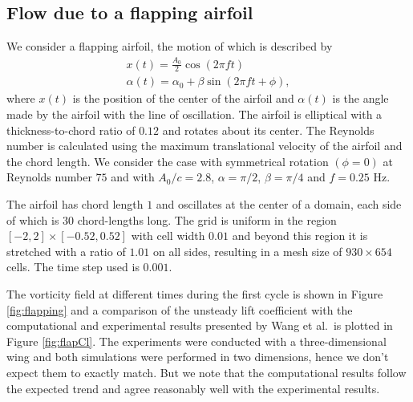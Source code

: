 \documentclass{tufte-handout}
\begin{document}
\subsection{\large Flow due to a flapping airfoil}

We consider a flapping airfoil, the motion of which is described by
\begin{align}
	x(t) = \frac{A_0}{2} \cos (2{\pi}{f}{t}) \nonumber \\
	\alpha (t) = \alpha_0 + \beta \sin ( 2{\pi}{f}{t} + \phi ), \nonumber
\end{align}
where $x(t)$ is the position of the center of the airfoil and $\alpha(t)$ is the angle made by the airfoil with the line of oscillation. The airfoil is elliptical with a thickness-to-chord ratio of $0.12$ and rotates about its center. The Reynolds number is calculated using the maximum translational velocity of the airfoil and the chord length. We consider the case with symmetrical rotation $(\phi=0)$ at Reynolds number $75$ and with ${A_0}/{c}=2.8$, $\alpha=\pi/2$, $\beta=\pi/4$ and $f=0.25$ Hz.

The airfoil has chord length $1$ and oscillates at the center of a domain, each side of which is $30$ chord-lengths long. The grid is uniform in the region $[-2,2]\times[-0.52,0.52]$ with cell width $0.01$ and beyond this region it is stretched with a ratio of $1.01$ on all sides, resulting in a mesh size of $930\times{654}$ cells. The time step used is $0.001$.

The vorticity field at different times during the first cycle is shown in Figure \ref{fig:flapping} and a comparison of the unsteady lift coefficient with the computational and experimental results presented by Wang et al.\ is plotted in Figure \ref{fig:flapCl}. The experiments were conducted with a three-dimensional wing and both simulations were performed in two dimensions, hence we don't expect them to exactly match. But we note that the computational results follow the expected trend and agree reasonably well with the experimental results.
\end{document}
